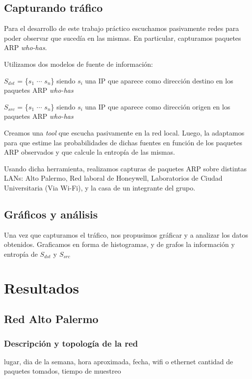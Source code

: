 \documentclass[10pt, a4paper]{article}
\begin{document}
\subsection{Capturando tráfico}
Para el desarrollo de este trabajo práctico escuchamos pasivamente redes para poder observar que sucedía en las mismas. En particular, capturamos paquetes ARP \emph{who-has}.

Utilizamos dos modelos de fuente de información:

$S_{dst}$ = \{$s_1$ $\cdots$ $s_n$\} siendo $s_i$ una IP que aparece como dirección destino en los paquetes ARP \emph{who-has}

$S_{src}$ = \{$s_1$ $\cdots$ $s_n$\} siendo $s_i$ una IP que aparece como dirección origen en los paquetes ARP \emph{who-has}

Creamos una \emph{tool} que escucha pasivamente en la red local. Luego, la adaptamos para que estime las probabilidades de dichas fuentes en función de los paquetes ARP observados y que calcule la entropía de las mismas.

Usando dicha herramienta, realizamos capturas de paquetes ARP sobre distintas LANs: Alto Palermo, Red laboral de Honeywell, Laboratorios de Ciudad Universitaria (Via Wi-Fi), y la casa de un integrante del grupo.

\subsection{Gráficos y análisis}

Una vez que capturamos el tráfico, nos propusimos gráficar y a analizar los datos obtenidos. Graficamos en forma de histogramas, y de grafos la información y entropía de $S_{dst}$ y $S_{src}$

\section{Resultados}

\subsection{Red Alto Palermo}

\subsubsection{Descripción y topología de la red}

lugar, dia de la semana, hora aproximada, fecha, wifi o ethernet
cantidad de paquetes tomados, tiempo de muestreo
\end{document}
